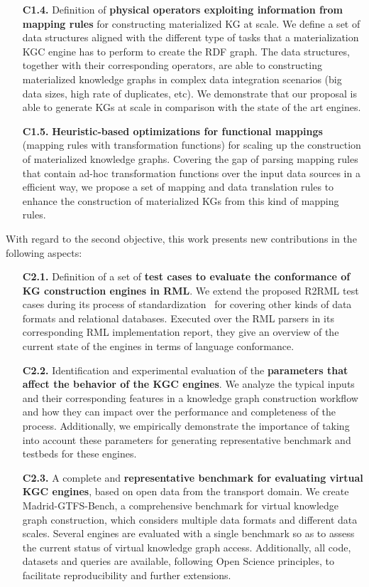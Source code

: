 \begin{enumerate}
    \item[\textbf{C1.4.}] Definition of \textbf{physical operators exploiting information from mapping rules} for constructing materialized KG at scale. We define a set of data structures  aligned with the different type of tasks that a materialization KGC engine has to perform to create the RDF graph. The data structures, together with their corresponding operators, are able to constructing materialized knowledge graphs in complex data integration scenarios (big data sizes, high rate of duplicates, etc). We demonstrate that our proposal is able to generate KGs at scale in comparison with the state of the art engines. 
    \item[\textbf{C1.5.}] \textbf{Heuristic-based optimizations for functional mappings} (mapping rules with transformation functions) for scaling up the construction of materialized knowledge graphs. Covering the gap of parsing mapping rules that contain ad-hoc transformation functions over the input data sources in a efficient way, we propose a set of mapping and data translation rules to enhance the construction of materialized KGs from this kind of mapping rules.
\end{enumerate}

With regard to the second objective, this work presents new contributions in the following aspects:
\begin{enumerate}
    \item[\textbf{C2.1.}] Definition of a set of \textbf{test cases to evaluate the conformance of KG construction engines in RML}. We extend the proposed R2RML test cases during its process of standardization~\citep{R2RML_test_cases} for covering other kinds of data formats and relational databases. Executed over the RML parsers in its corresponding RML implementation report, they give an overview of the current state of the engines in terms of language conformance.
    \item[\textbf{C2.2.}] Identification and experimental evaluation of the \textbf{parameters that affect the behavior of the KGC engines}. We analyze the typical inputs and their corresponding features in a knowledge graph construction workflow and how they can impact over the performance and completeness of the process. Additionally, we empirically demonstrate the importance of taking into account these parameters for generating representative benchmark and testbeds for these engines.
    \item[\textbf{C2.3.}] A complete and \textbf{representative benchmark for evaluating virtual KGC engines}, based on open data from the transport domain. We create Madrid-GTFS-Bench, a comprehensive benchmark for virtual knowledge graph construction, which considers multiple data formats and different data scales. Several engines are evaluated with a single benchmark so as to assess the current status of virtual knowledge graph access. Additionally, all code, datasets and queries are available, following Open Science principles, to facilitate reproducibility and further extensions.
\end{enumerate}

